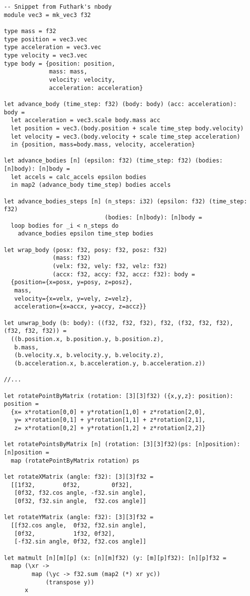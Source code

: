\begin{lstlisting}[language=Futhark, basicstyle=\footnotesize\ttfamily]
-- Snippet from Futhark's nbody
module vec3 = mk_vec3 f32

type mass = f32
type position = vec3.vec
type acceleration = vec3.vec
type velocity = vec3.vec
type body = {position: position,
             mass: mass,
             velocity: velocity,
             acceleration: acceleration}

let advance_body (time_step: f32) (body: body) (acc: acceleration): body =
  let acceleration = vec3.scale body.mass acc
  let position = vec3.(body.position + scale time_step body.velocity)
  let velocity = vec3.(body.velocity + scale time_step acceleration)
  in {position, mass=body.mass, velocity, acceleration}

let advance_bodies [n] (epsilon: f32) (time_step: f32) (bodies: [n]body): [n]body =
  let accels = calc_accels epsilon bodies
  in map2 (advance_body time_step) bodies accels

let advance_bodies_steps [n] (n_steps: i32) (epsilon: f32) (time_step: f32)
                             (bodies: [n]body): [n]body =
  loop bodies for _i < n_steps do
    advance_bodies epsilon time_step bodies

let wrap_body (posx: f32, posy: f32, posz: f32)
              (mass: f32)
              (velx: f32, vely: f32, velz: f32)
              (accx: f32, accy: f32, accz: f32): body =
  {position={x=posx, y=posy, z=posz},
   mass,
   velocity={x=velx, y=vely, z=velz},
   acceleration={x=accx, y=accy, z=accz}}

let unwrap_body (b: body): ((f32, f32, f32), f32, (f32, f32, f32), (f32, f32, f32)) =
  ((b.position.x, b.position.y, b.position.z),
   b.mass,
   (b.velocity.x, b.velocity.y, b.velocity.z),
   (b.acceleration.x, b.acceleration.y, b.acceleration.z))

//...

let rotatePointByMatrix (rotation: [3][3]f32) ({x,y,z}: position): position =
  {x= x*rotation[0,0] + y*rotation[1,0] + z*rotation[2,0],
   y= x*rotation[0,1] + y*rotation[1,1] + z*rotation[2,1],
   z= x*rotation[0,2] + y*rotation[1,2] + z*rotation[2,2]}

let rotatePointsByMatrix [n] (rotation: [3][3]f32)(ps: [n]position): [n]position =
  map (rotatePointByMatrix rotation) ps

let rotateXMatrix (angle: f32): [3][3]f32 =
  [[1f32,        0f32,         0f32],
   [0f32, f32.cos angle, -f32.sin angle],
   [0f32, f32.sin angle,  f32.cos angle]]

let rotateYMatrix (angle: f32): [3][3]f32 =
  [[f32.cos angle,  0f32, f32.sin angle],
   [0f32,           1f32, 0f32],
   [-f32.sin angle, 0f32, f32.cos angle]]

let matmult [n][m][p] (x: [n][m]f32) (y: [m][p]f32): [n][p]f32 =
  map (\xr ->
        map (\yc -> f32.sum (map2 (*) xr yc))
            (transpose y))
      x
\end{lstlisting}
